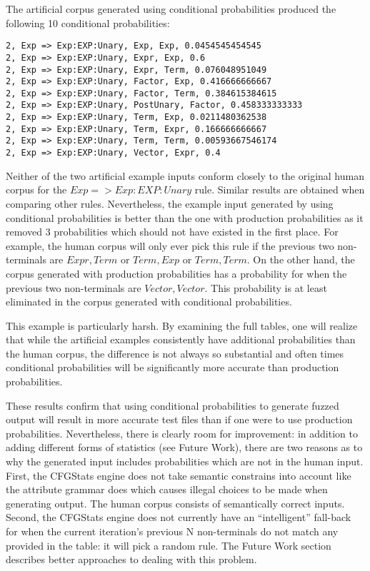 The artificial corpus generated using conditional probabilities produced the
following 10 conditional probabilities: \\

\noindent
\begin{verbatim}
2, Exp => Exp:EXP:Unary, Exp, Exp, 0.0454545454545
2, Exp => Exp:EXP:Unary, Expr, Exp, 0.6
2, Exp => Exp:EXP:Unary, Expr, Term, 0.076048951049
2, Exp => Exp:EXP:Unary, Factor, Exp, 0.416666666667
2, Exp => Exp:EXP:Unary, Factor, Term, 0.384615384615
2, Exp => Exp:EXP:Unary, PostUnary, Factor, 0.458333333333
2, Exp => Exp:EXP:Unary, Term, Exp, 0.0211480362538
2, Exp => Exp:EXP:Unary, Term, Expr, 0.166666666667
2, Exp => Exp:EXP:Unary, Term, Term, 0.00593667546174
2, Exp => Exp:EXP:Unary, Vector, Expr, 0.4
\end{verbatim}

Neither of the two artificial example inputs conform closely to the
original human corpus for the $Exp => Exp:EXP:Unary$ rule. Similar results are
obtained when comparing other rules. Nevertheless, the example input generated
by using conditional probabilities is better than the one with production
probabilities as it removed 3 probabilities which should not have existed in
the first place. For example, the human corpus will only ever pick this rule if
the previous two non-terminals are $Expr, Term$ or $Term, Exp$ or $Term, Term$.
On the other hand, the corpus generated with production probabilities has a
probability for when the previous two non-terminals are $Vector, Vector$. This
probability is at least eliminated in the corpus generated with conditional
probabilities.

This example is particularly harsh. By examining the full tables, one will
realize that while the artificial examples consistently have additional
probabilities than the human corpus, the difference is not always so substantial
and often times conditional probabilities will be significantly more accurate
than production probabilities.

These results confirm that using conditional probabilities to generate fuzzed
output will result in more accurate test files than if one were to use
production probabilities. Nevertheless, there is clearly room for improvement:
in addition to adding different forms of statistics (see Future Work), there
are two reasons as to why the generated input includes probabilities which are
not in the human input. First, the CFGStats engine does not take semantic
constrains into account like the attribute grammar does which causes illegal
choices to be made when generating output. The human corpus consists of
semantically correct inputs. Second, the CFGStats engine does not currently
have an ``intelligent'' fall-back for when the current iteration's previous N
non-terminals do not match any provided in the table: it will pick a random
rule. The Future Work section describes better approaches to dealing with this
problem.

